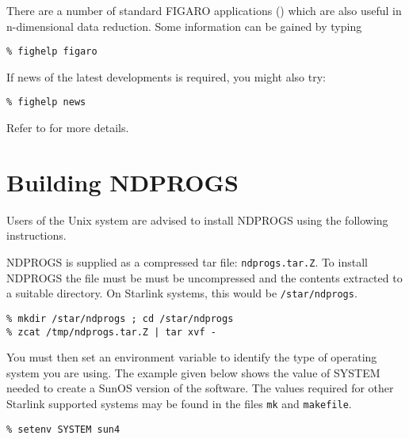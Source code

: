 There are a number of standard FIGARO applications ()
which are also useful in
n-dimensional data reduction. Some information can be gained by typing

\begin{myquote}
\begin{verbatim}
% fighelp figaro
\end{verbatim}
\end{myquote}

If news of the latest developments is required, you might also try:

\begin{myquote}
\begin{verbatim}
% fighelp news
\end{verbatim}
\end{myquote}

Refer to
for more details.

\section{Building NDPROGS{}}
\label{sec:building}

Users of the Unix system are advised to install NDPROGS
using the following instructions.

NDPROGS is supplied as a compressed tar file: {\tt ndprogs.tar.Z}. To install
NDPROGS the file must be must be uncompressed and the contents extracted to a
suitable directory.  On Starlink systems, this would be {\tt /star/ndprogs}.

\begin{myquote}
\begin{verbatim}
% mkdir /star/ndprogs ; cd /star/ndprogs
% zcat /tmp/ndprogs.tar.Z | tar xvf -
\end{verbatim}
\end{myquote}

You must then set an environment variable to identify the type of
operating system you are using. The example given below shows the value
of SYSTEM needed to create a SunOS version of the software. The values
required for other Starlink supported systems may be found in the files
{\tt mk} and {\tt makefile}.

\begin{myquote}
\begin{verbatim}
% setenv SYSTEM sun4
\end{verbatim}
\end{myquote}

